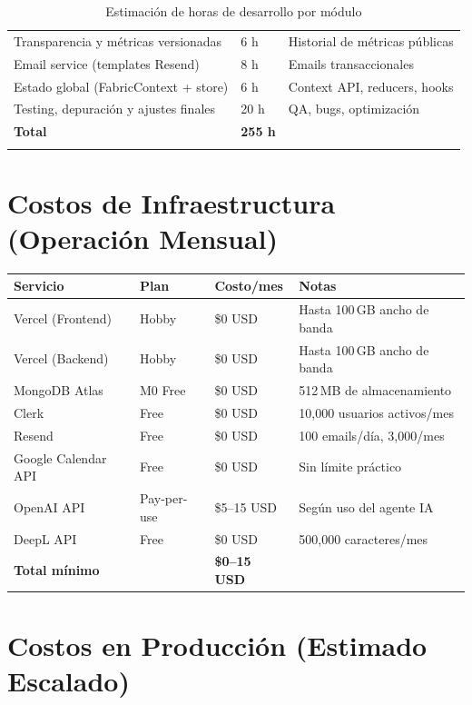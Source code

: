 \documentclass[12pt, a4paper, twoside]{report}
\begin{document}
\begin{center}
\begin{longtable}{L{7.5cm} C{2cm} L{4cm}}
  Transparencia y métricas versionadas & 6 h & Historial de métricas públicas \\[3pt]
  Email service (templates Resend) & 8 h & Emails transaccionales \\[3pt]
  Estado global (FabricContext + store) & 6 h & Context API, reducers, hooks \\[3pt]
  Testing, depuración y ajustes finales & 20 h & QA, bugs, optimización \\
  \midrule
  \textbf{Total} & \textbf{255 h} & \\
  \bottomrule
  \caption{Estimación de horas de desarrollo por módulo}
\end{longtable}
\end{center}

\section{Costos de Infraestructura (Operación Mensual)}

\begin{center}
\begin{tabular}{L{4cm} C{2.5cm} C{2.5cm} L{4cm}}
  \toprule
  \textbf{Servicio} & \textbf{Plan} & \textbf{Costo/mes} & \textbf{Notas} \\
  \midrule
  Vercel (Frontend)    & Hobby  & \$0 USD  & Hasta 100\,GB ancho de banda \\
  Vercel (Backend)     & Hobby  & \$0 USD  & Hasta 100\,GB ancho de banda \\
  MongoDB Atlas        & M0 Free& \$0 USD  & 512\,MB de almacenamiento \\
  Clerk                & Free   & \$0 USD  & 10,000 usuarios activos/mes \\
  Resend               & Free   & \$0 USD  & 100 emails/día, 3,000/mes \\
  Google Calendar API  & Free   & \$0 USD  & Sin límite práctico \\
  OpenAI API           & Pay-per-use & \$5--15 USD & Según uso del agente IA \\
  DeepL API            & Free   & \$0 USD  & 500,000 caracteres/mes \\
  \midrule
  \textbf{Total mínimo} & & \textbf{\$0--15 USD} & \\
  \bottomrule
\end{tabular}
\end{center}

\section{Costos en Producción (Estimado Escalado)}
\end{document}
